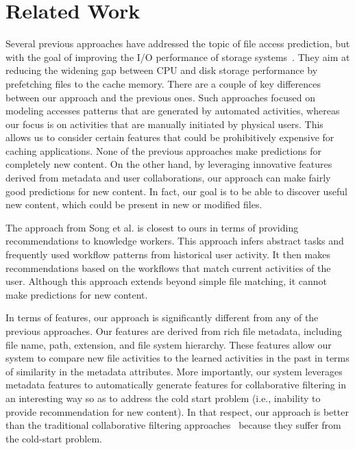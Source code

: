 \section{Related Work}
\label{sec:relatedwork}
Several previous approaches have addressed the topic of file access
prediction, but with the goal of improving the I/O performance of
storage systems~\cite{Amer02fileaccess, Xia08farmer, kroeger01-usenix,
  yeh02-hpcs, yeh01-mascots, yeh01-ispass, Whittle03usingmultiple,
  Paris-stochastic}.  They aim at reducing the widening gap between
CPU and disk storage performance by prefetching files to the cache
memory.
There are a couple of key differences between our approach and the
previous ones.  Such approaches focused on modeling accesses
patterns that are generated by automated activities, whereas our focus
is on activities that are manually initiated by physical users.  This
allows us to consider certain features that could be prohibitively
expensive for caching applications.  None of the previous approaches
make predictions for completely new content.  On the other hand, by
leveraging innovative features derived from metadata and user
collaborations, our approach can make fairly good predictions for new
content.  In fact, our goal is to be able to discover useful new
content, which could be present in new or modified files.

The approach from Song et al.\cite{song14-tis} is closest to ours in
terms of providing recommendations to knowledge workers.  This
approach infers abstract tasks and frequently used workflow patterns
from historical user activity.  It then makes recommendations based on
the workflows that match current activities of the user.  Although
this approach extends beyond simple file matching, it cannot make
predictions for new content.

In terms of features, our approach is significantly different from any
of the previous approaches.  Our features are derived from rich file
metadata, including file name, path, extension, and file system
hierarchy.  These features allow our system to compare new file
activities to the learned activities in the past in terms of
similarity in the metadata attributes.  More importantly, our system
leverages metadata features to automatically generate features for
collaborative filtering in an interesting way so as to address the
cold start problem (i.e., inability to provide recommendation for new
content).  In that respect, our approach is better than the
traditional collaborative filtering approaches~\cite{linden2003amazon,
  breese1998empirical} because they suffer from the cold-start
problem.

